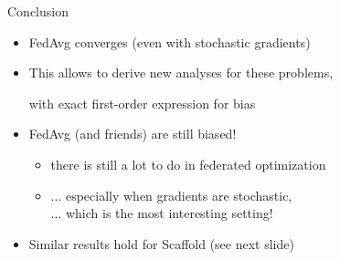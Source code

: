 \documentclass[aspectratio=169,12pt]{beamer}
\begin{document}

\begin{frame}{Conclusion}

  \begin{itemize}[itemsep=1em]
  \item FedAvg converges (even with stochastic gradients)
  \item This allows to derive new analyses for these problems,

    with exact first-order expression for bias
    
  \item FedAvg (and friends) are still biased!
    \begin{itemize}
    \item there is still a lot to do in federated optimization
    \item ... especially when gradients are stochastic, \\
      \qquad ... which is the most interesting setting!
    \end{itemize}

  \item Similar results hold for Scaffold (see next slide)
  \end{itemize}
  
\end{frame}
\end{document}
